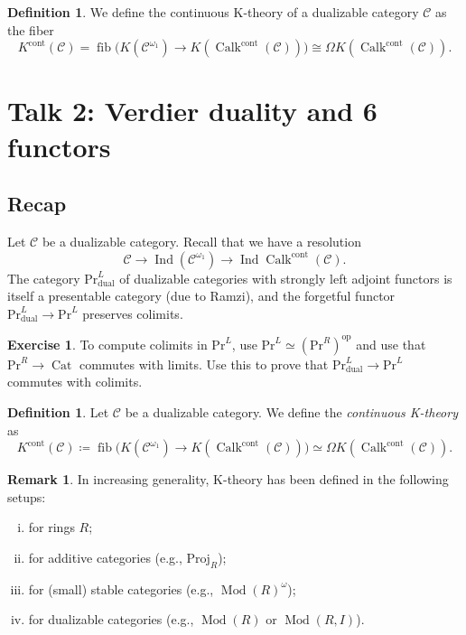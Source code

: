 \documentclass[draft]{amsart}
\newcommand{\cat}[1]{\mathcal{#1}}
\newcommand{\op}{\mathrm{op}}
\renewcommand{\Pr}{\mathrm{Pr}}
\DeclareMathOperator{\fib}{fib}
\DeclareMathOperator{\Ind}{Ind}
\DeclareMathOperator{\Cat}{Cat}
\DeclareMathOperator{\Mod}{Mod}
\DeclareMathOperator{\Calk}{Calk}
\theoremstyle{definition}
\newtheorem{defn}[thm]{Definition}
\newtheorem{rem}[thm]{Remark}
\newtheorem{exercise}[thm]{Exercise}
\begin{document}
\begin{defn}
We define the continuous K-theory of a dualizable category $\cat C$ as the fiber
\[
K^{\mathrm{cont}}(\cat C) = \fib\bigl(K(\cat C^{\omega_1}) \to K(\Calk^{\mathrm{cont}}(\cat C))\bigr) \cong \Omega K(\Calk^{\mathrm{cont}}(\cat C)).
\]
\end{defn}


\section{Talk 2: Verdier duality and 6 functors}
\subsection{Recap}
Let $\cat C$ be a dualizable category. Recall that we have a resolution
\[
\cat C \to \Ind(\cat C^{\omega_1}) \to \Ind\Calk^{\mathrm{cont}}(\cat C).
\]
The category $\Pr^L_{\mathrm{dual}}$ of dualizable categories with strongly left adjoint functors is itself a presentable category (due to Ramzi), and the forgetful functor $\Pr^L_{\mathrm{dual}} \to \Pr^L$ preserves colimits. 

\begin{exercise}
To compute colimits in $\Pr^L$, use $\Pr^L \simeq (\Pr^R)^{\op}$ and use that $\Pr^R \to \Cat$ commutes with limits. Use this to prove that $\Pr^L_{\mathrm{dual}} \to \Pr^L$ commutes with colimits.
\end{exercise}

\begin{defn}
Let $\cat C$ be a dualizable category. We define the \emph{continuous K-theory} as
\[
K^{\mathrm{cont}}(\cat C)\coloneqq \fib\bigl(K(\cat C^{\omega_1}) \to K(\Calk^{\mathrm{cont}}(\cat C))\bigr) \simeq \Omega K(\Calk^{\mathrm{cont}}(\cat C)).
\]
\end{defn}

\begin{rem}
In increasing generality, K-theory has been defined in the following setups:
\begin{enumerate}[(i)]
\item for rings $R$;
\item for additive categories (e.g., $\mathrm{Proj}_R$);
\item for (small) stable categories (e.g., $\Mod(R)^{\omega}$);
\item for dualizable categories (e.g., $\Mod(R)$ or $\Mod(R,I)$).
\end{enumerate}
\end{rem}
\end{document}
